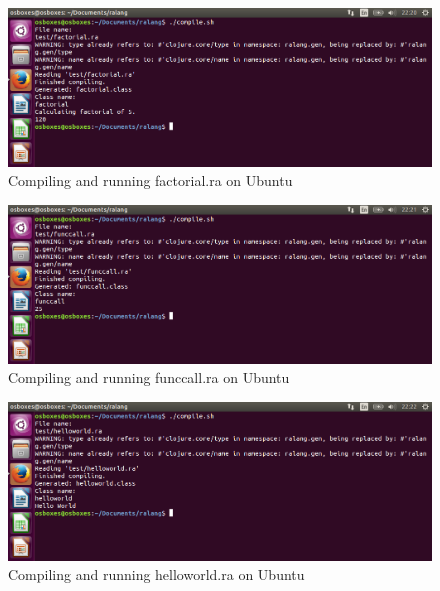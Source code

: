 \documentclass[a4paper]{article}
\begin{document}
\begin{appendices}
\begin{figure}[h!]
		\label{fig:ubuntu_complex}
	\end{figure}
	\newpage
	\begin{figure}[h!]
		\centering
		\includegraphics[width=\linewidth]{images/ubuntu_factorial.png}
		\caption[Compiling and running factorial.ra on Ubuntu 15.10 64-bit]{Compiling and running factorial.ra on Ubuntu}
		\label{fig:ubuntu_factorial}
	\end{figure}
	\begin{figure}[h!]
		\centering
		\includegraphics[width=\linewidth]{images/ubuntu_funccall.png}
		\caption[Compiling and running funccall.ra on Ubuntu 15.10 64-bit]{Compiling and running funccall.ra on Ubuntu}
		\label{fig:ubuntu_funccall}
	\end{figure}
	\begin{figure}[h!]
		\centering
		\includegraphics[width=\linewidth]{images/ubuntu_helloworld.png}
		\caption[Compiling and running helloworld.ra on Ubuntu 15.10 64-bit]{Compiling and running helloworld.ra on Ubuntu}
		\label{fig:ubuntu_helloworld}
	\end{figure}

\end{appendices}
\end{document}
